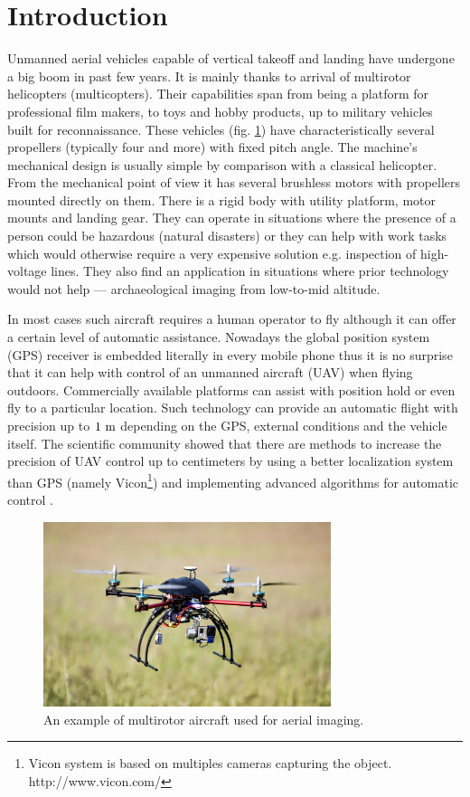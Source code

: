 \section{Introduction}

Unmanned aerial vehicles capable of vertical takeoff and landing have undergone a big boom in past few years. It is mainly thanks to arrival of multirotor helicopters (multicopters). Their capabilities span from being a platform for professional film makers, to toys and hobby products, up to military vehicles built for reconnaissance. These vehicles (fig. \ref{fig:quadru1}) have characteristically several propellers (typically four and more) with fixed pitch angle. The machine's mechanical design is usually simple by comparison with a classical helicopter. From the mechanical point of view it has several brushless motors with propellers mounted directly on them. There is a rigid body with utility platform, motor mounts and landing gear. They can operate in situations where the presence of a person could be hazardous (natural disasters) or they can help with work tasks which would otherwise require a very expensive solution e.g. inspection of high-voltage lines. They also find an application in situations where prior technology would not help --- archaeological imaging from low-to-mid altitude.

In most cases such aircraft requires a human operator to fly although it can offer a certain level of automatic assistance. Nowadays the global position system (GPS) receiver is embedded literally in every mobile phone thus it is no surprise that it can help with control of an unmanned aircraft (UAV) when flying outdoors. Commercially available platforms can assist with position hold or even fly to a particular location. Such technology can provide an automatic flight with precision up to $1 ~\mathrm{m}$ depending on the GPS, external conditions and the vehicle itself. The scientific community showed that there are methods to increase the precision of UAV control up to centimeters by using a better localization system than GPS (namely Vicon\footnote{Vicon system is based on multiples cameras capturing the object. http://www.vicon.com/}) and implementing advanced algorithms for automatic control \citep{brescianini2013polearobatics, kumar2010grasp}.

\begin{figure}[h]
\centering
\includegraphics[width=0.75\textwidth]{fig/quadru1.jpg}
\caption{An example of multirotor aircraft used for aerial imaging.}
\label{fig:quadru1}
\end{figure}

